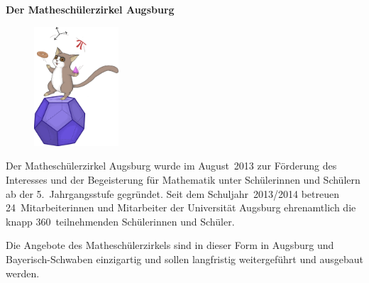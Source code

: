 \documentclass[12pt]{zettel}
\begin{document}
\pagestyle{plain}

\renewcommand{\betreff}{}

\vspace{-2em}

\begin{center}

  \Large\textbf{\textsf{Der Matheschülerzirkel Augsburg}}
  \hfill
\end{center}


\begin{figure}
  \vspace{-2.7em}
  \begin{flushright}
     \includegraphics[width=0.28\textwidth]{cover.png}
  \end{flushright}
  \vspace{-6em}
\end{figure}


\vspace{1em}

Der Matheschülerzirkel Augsburg wurde im August~2013 zur Förderung des
Interesses und der Begeisterung für Mathematik unter Schülerinnen und Schülern
ab der 5.~Jahrgangsstufe gegründet. Seit dem Schuljahr~2013/2014 betreuen
24~Mitarbeiterinnen und Mitarbeiter der Universität Augsburg ehrenamtlich die knapp
360~teilnehmenden Schülerinnen und Schüler.

Die Angebote des Matheschülerzirkels sind in dieser Form in Augsburg und Bayerisch-Schwaben einzigartig
und sollen langfristig weitergeführt und ausgebaut werden.

\end{document}
